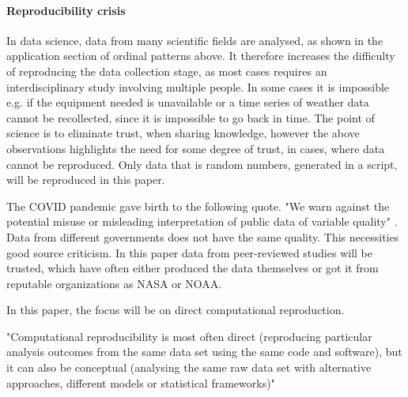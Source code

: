 \paragraph{Reproducibility crisis}
In data science, data from many scientific fields are analysed, as shown in the application section of ordinal patterns above. It therefore increases the difficulty of reproducing the data collection stage, as most cases requires an interdisciplinary study involving multiple people. In some cases it is impossible e.g. if the equipment needed is unavailable or a time series of weather data cannot be recollected, since it is impossible to go back in time. The point of science is to eliminate trust, when sharing knowledge, however the above observations highlights the need for some degree of trust, in cases, where data cannot be reproduced. Only data that is random numbers, generated in a script, will be reproduced in this paper.

The COVID pandemic gave birth to the following quote. "We warn against the potential misuse or misleading interpretation of public data of variable quality" \cite{Struelens2021}. Data from different governments does not have the same quality. This necessities good source criticism. In this paper data from peer-reviewed studies will be trusted, which have often either produced the data themselves or got it from reputable organizations as NASA or NOAA. 

In this paper, the focus will be on direct computational reproduction.

"Computational reproducibility is most often direct (reproducing particular analysis outcomes from the same data set using the same code and software), but it can also be conceptual (analysing the same raw data set with alternative approaches, different models or statistical frameworks)" \cite{Fidler2018}

